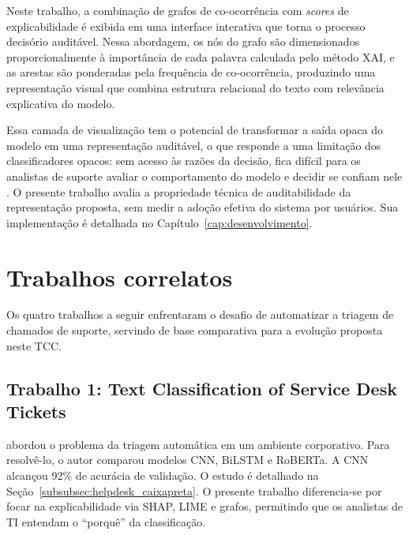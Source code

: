 \documentclass[
    12pt,                %
    openright,           %
    oneside,             %
    a4paper,             %
    english,             %
    brazil               %
]{abntex2}
\begin{document}
\label{subsubsec:grafo_xai_visualizacao}

Neste trabalho, a combinação de grafos de co-ocorrência com \textit{scores} de explicabilidade é exibida em uma interface interativa que torna o processo decisório auditável. Nessa abordagem, os nós 
do grafo são dimensionados proporcionalmente à importância de cada 
palavra calculada pelo método XAI, e as arestas são ponderadas 
pela frequência de co-ocorrência, produzindo uma representação visual 
que combina estrutura relacional do texto com relevância explicativa 
do modelo.

Essa camada de visualização tem o potencial de transformar a saída 
opaca do modelo em uma representação auditável, o que responde a uma limitação dos classificadores opacos: sem acesso às razões da decisão, fica difícil para os analistas de suporte avaliar o comportamento do modelo e decidir se confiam nele \cite{ribeiro2016}. O presente trabalho avalia a 
propriedade técnica de auditabilidade da representação proposta, sem 
medir a adoção efetiva do sistema por usuários. Sua implementação é detalhada no Capítulo~\ref{cap:desenvolvimento}.

\section{Trabalhos correlatos}
\label{sec:trabalhos_relacionados}

Os quatro trabalhos a seguir enfrentaram o desafio de automatizar a triagem de chamados de suporte, servindo de base comparativa para a evolução proposta neste TCC.

\subsection{Trabalho 1: Text Classification of Service Desk Tickets}

 abordou o problema da triagem automática em um ambiente corporativo. 
Para resolvê-lo, o autor comparou modelos CNN, BiLSTM e RoBERTa. A CNN alcançou 92\% de acurácia de validação. O estudo é detalhado na Seção~\ref{subsubsec:helpdesk_caixapreta}. O presente trabalho 
diferencia-se por focar na explicabilidade via SHAP, LIME e grafos, permitindo que os analistas de TI 
entendam o ``porquê'' da classificação.
\end{document}
